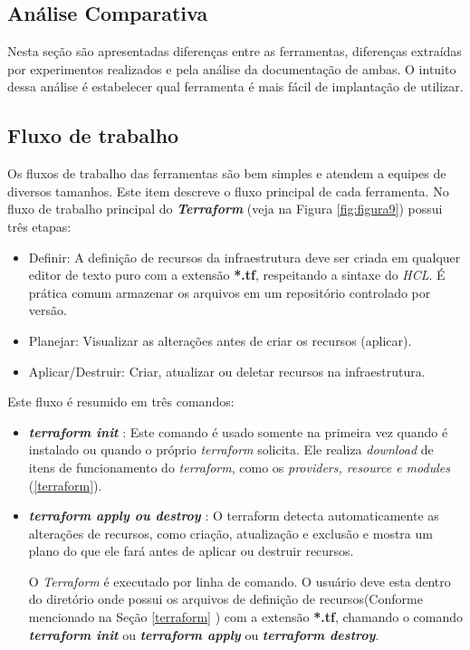 \subsection{ Análise Comparativa }

Nesta seção são apresentadas diferenças entre as ferramentas, diferenças extraídas por experimentos realizados e pela análise da documentação de ambas. O intuito dessa análise é estabelecer qual ferramenta é mais fácil de implantação de utilizar.

\subsection{Fluxo de trabalho}
Os fluxos de trabalho  das ferramentas são bem simples e atendem a equipes de diversos tamanhos. Este item descreve o fluxo principal de cada ferramenta. No fluxo de trabalho principal do \textbf {\textit{Terraform}} (veja na Figura \ref{fig:figura9}) possui três etapas: 

\begin{itemize}
  \item Definir: A definição de recursos da infraestrutura deve ser criada em qualquer editor de texto puro com a extensão \textbf{*.tf}, respeitando a sintaxe do \textit{HCL}. É prática comum armazenar os arquivos em um repositório controlado por versão.
   \item Planejar: Visualizar as alterações antes de criar os recursos (aplicar).
   \item Aplicar/Destruir: Criar, atualizar ou deletar recursos na infraestrutura. 
\end{itemize}


Este fluxo é resumido em três comandos: 


\begin{itemize}

\item \textbf{\textit{terraform init }}: Este comando é usado somente na primeira vez quando é instalado ou quando o próprio \textit{terraform} solicita. Ele realiza \textit{download} de itens de funcionamento do \textit{terraform}, como os \textit{providers, resource e modules} (\ref{terraform}). 

\item \textbf{\textit{terraform apply ou destroy }}: O terraform  detecta automaticamente as alterações de recursos, como criação, atualização e exclusão e mostra um plano do que ele fará antes de aplicar ou destruir recursos.

O \textit{Terraform} é executado por linha de comando. O usuário deve esta dentro do diretório onde possui os arquivos de definição de recursos(Conforme mencionado na Seção \ref{terraform} )  com a extensão \textbf{*.tf}, chamando o comando \textbf{\textit{terraform init}} ou \textbf{\textit{terraform apply}} ou \textbf{\textit{terraform destroy}}.  


\end{itemize}

